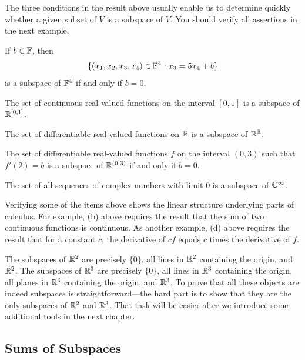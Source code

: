 The three conditions in the result above usually enable us to determine quickly
whether a given subset of $V$ is a subspace of $V$. You should verify all
assertions in the next example.

\begin{example}[Subspaces]\label{ax:1.35}\leavevmode
\begin{parts}
\item If $b\in\mathbb{F}$, then
  \[ \{(x_1,x_2,x_3,x_4)\in\mathbb{F}^4 : x_3=5x_4+b\} \]
  is a subspace of $\mathbb{F}^4$ if and only if $b=0$.
\item The set of continuous real-valued functions on the interval $[0,1]$ is a
  subspace of $\mathbb{R}^{[0,1]}$.
\item The set of differentiable real-valued functions on $\mathbb{R}$ is a subspace of
  $\mathbb{R}^{\mathbb{R}}$.
\item The set of differentiable real-valued functions $f$ on the interval
  $(0,3)$ such that $f'(2)=b$ is a subspace of $\mathbb{R}^{(0,3)}$ if and only if
  $b=0$.
\item The set of all sequences of complex numbers with limit $0$ is a subspace
  of $\mathbb{C}^\infty$.
\end{parts}
\end{example}

%
Verifying some of the items above shows the linear structure underlying parts
of calculus. For example, (b) above requires the result that the sum of two
continuous functions is continuous. As another example, (d) above requires the
result that for a constant $c$, the derivative of $cf$ equals $c$ times the
derivative of $f$.

The subspaces of $\mathbb{R}^2$ are precisely $\{0\}$, all lines in $\mathbb{R}^2$ containing
the origin, and $\mathbb{R}^2$. The subspaces of $\mathbb{R}^3$ are precisely $\{0\}$, all lines
in $\mathbb{R}^3$ containing the origin, all planes in $\mathbb{R}^3$ containing the origin, and
$\mathbb{R}^3$. To prove that all these objects are indeed subspaces is
straightforward---the hard part is to show that they are the only subspaces of
$\mathbb{R}^2$ and $\mathbb{R}^3$. That task will be easier after we introduce some additional
tools in the next chapter.

\subsection{Sums of Subspaces}

